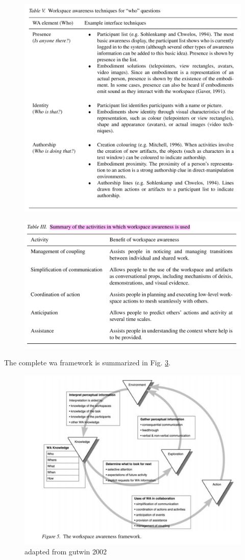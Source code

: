 \begin{figure}
	\centering
	\includegraphics[width=0.7\linewidth]{figures/placeholders/WA_techniques_for_WHO_questions}
	\caption{}
	\label{fig:watechniquesforwhoquestions}
\end{figure}

\begin{figure}
	\centering
	\includegraphics[width=0.7\linewidth]{figures/placeholders/summary_of_activities_wher_WA_can_be_used}
	\caption{}
	\label{fig:summaryofactivitieswherwacanbeused}
\end{figure}


The complete \gls{wa} framework is summarized in Fig. \ref{fig:waframework}.

\begin{figure}
	\centering
	\includegraphics[width=0.7\linewidth]{figures/placeholders/WA_framework}
	\caption{adapted from gutwin 2002}
	\label{fig:waframework}
\end{figure}


